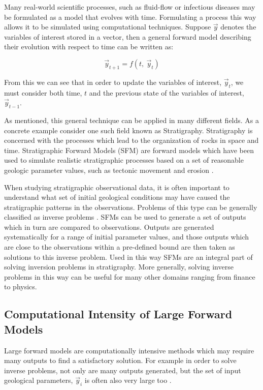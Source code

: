\documentclass[12pt]{article}
\begin{document}
Many real-world scientific processes, such as fluid-flow or infectious diseases may be formulated as a model that evolves with time. Formulating a process this way allows it to be simulated using computational techniques. Suppose $\vec y$ denotes the variables of interest stored in a vector, then a general forward model describing their evolution with respect to time can be written as:

\begin{center}
	\begin{equation}
	\vec y_{t+1} = f(t, ~\vec y_t)
	\end{equation}
\end{center}

From this we can see that in order to update the variables of interest, $\vec y_t$, we must consider both time, $t$ and the previous state of the variables of interest, $\vec y_{t-1}$.

As mentioned, this general technique can be applied in many different fields. As a concrete example consider one such field known as Stratigraphy. Stratigraphy is concerned with the processes which lead to the organization of rocks in space and time. Stratigraphic Forward Models (SFM) are forward models which have been used to simulate realistic stratigraphic processes based on a set of reasonable geologic parameter values, such as tectonic movement and erosion \cite{10.2110/pec.99.62.0069}.

When studying stratigraphic observational data, it is often important to understand what set of initial geological conditions may have caused the stratigraphic patterns in the observations. Problems of this type can be generally classified as inverse problems \cite{10.1260/0144598011492363}. SFMs can be used to generate a set of outputs which in turn are compared to observations. Outputs are generated systematically for a range of initial parameter values, and those outputs which are close to the observations within a pre-defined bound are then taken as solutions to this inverse problem. Used in this way SFMs are an integral part of solving inversion problems in stratigraphy. More generally, solving inverse problems in this way can be useful for many other domains ranging from finance to physics.

\subsection{Computational Intensity of Large Forward Models}
Large forward models are computationally intensive methods which may require many outputs to find a satisfactory solution. For example in order to solve inverse problems, not only are many outputs generated, but the set of input geological parameters, $\vec y_i$ is often also very large too \cite{10.1260/0144598011492363}.
\end{document}
